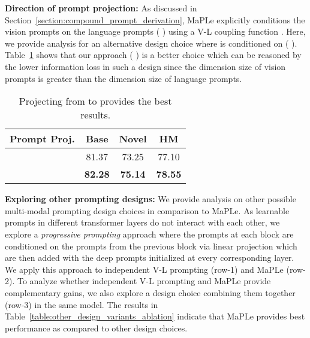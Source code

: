 \documentclass[10pt,twocolumn,letterpaper]{article}
\newcommand{\tablestyle}[2]{\setlength{\tabcolsep}{#1}\renewcommand{\arraystretch}{#2}\centering\footnotesize}
\begin{document}
\noindent \textbf{Direction of prompt projection:} As discussed in Section~\ref{section:compound_prompt_derivation}, MaPLe explicitly conditions the vision prompts  on the language prompts  (  ) using a V-L coupling function . Here, we provide analysis for an alternative design choice where  is conditioned on  (  ).
Table~\ref{table:ablation_projection_direction} shows that
our approach (\textit{  }) is a better choice which can be reasoned by the lower information loss in such a design since the dimension size  of vision prompts is greater than the dimension size  of language prompts.

\begin{table}[t]
\tablestyle{7pt}{1.1}
\addtolength{\tabcolsep}{-1.5pt}
\centering
\begin{tabular}{l ccc}
\toprule
Prompt Proj.  & Base & Novel & HM\\
\midrule
\textbf{  } & 81.37 & 73.25 &	77.10\\
\textbf{  } & \textbf{82.28} &	\textbf{75.14} &	\textbf{78.55}\\
\bottomrule
\end{tabular}
\caption{Projecting from  to  provides the best results.}
\label{table:ablation_projection_direction}
\end{table}

 \noindent \textbf{Exploring other prompting designs:} 
We provide analysis on other possible multi-modal prompting design choices in comparison to MaPLe. As learnable prompts in different transformer layers do not interact with each other, we explore a \textit{progressive prompting} approach where the prompts at each block are conditioned on the prompts from the previous block via linear projection which are then added with the deep prompts initialized at every corresponding layer. We apply this approach to independent V-L prompting (row-1) and MaPLe (row-2). To analyze whether independent V-L prompting and MaPLe provide complementary gains, we also explore a design choice combining them together (row-3) in the same model. The results in Table~\ref{table:other_design_variants_ablation} indicate that MaPLe provides best performance as compared to other design choices.  
\end{document}

